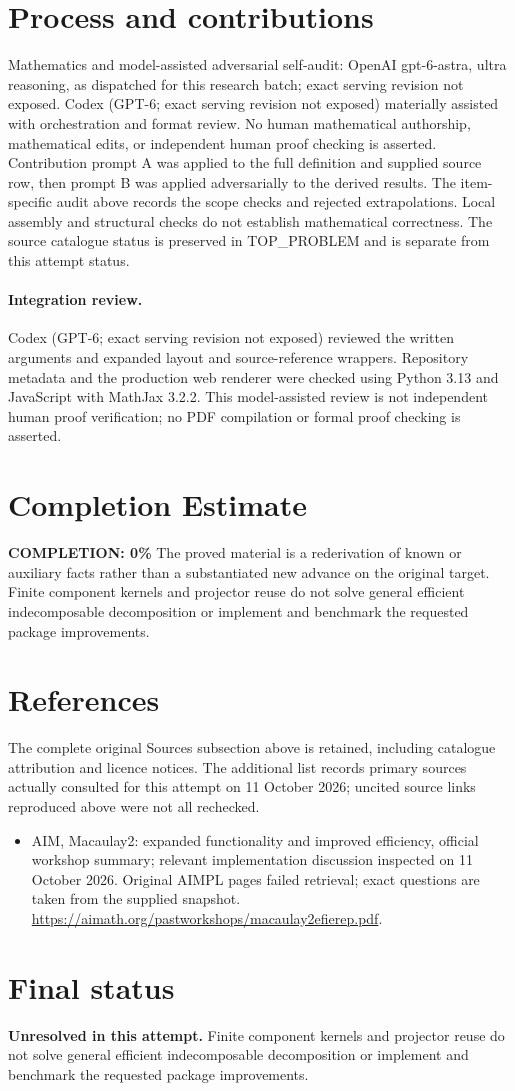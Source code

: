 \documentclass[11pt]{article}
\begin{document}
\section{Process and contributions}
Mathematics and model-assisted adversarial self-audit: OpenAI gpt-6-astra, ultra reasoning, as dispatched for this research batch; exact serving revision not exposed. Codex (GPT-6; exact serving revision not exposed) materially assisted with orchestration and format review. No human mathematical authorship, mathematical edits, or independent human proof checking is asserted.
Contribution prompt A was applied to the full definition and supplied source row, then prompt B was applied adversarially to the derived results. The item-specific audit above records the scope checks and rejected extrapolations. Local assembly and structural checks do not establish mathematical correctness. The source catalogue status is preserved in TOP\_PROBLEM and is separate from this attempt status.
\paragraph{Integration review.} Codex (GPT-6; exact serving revision not exposed) reviewed the written arguments and expanded layout and source-reference wrappers. Repository metadata and the production web renderer were checked using Python 3.13 and JavaScript with MathJax 3.2.2. This model-assisted review is not independent human proof verification; no PDF compilation or formal proof checking is asserted.

\section{Completion Estimate}
\noindent\textbf{COMPLETION: 0\%}
The proved material is a rederivation of known or auxiliary facts rather than a substantiated new advance on the original target. Finite component kernels and projector reuse do not solve general efficient indecomposable decomposition or implement and benchmark the requested package improvements.
\section{References}
The complete original Sources subsection above is retained, including catalogue attribution and licence notices. The additional list records primary sources actually consulted for this attempt on 11 October 2026; uncited source links reproduced above were not all rechecked.
\begin{itemize}
\item AIM, Macaulay2: expanded functionality and improved efficiency, official workshop summary; relevant implementation discussion inspected on 11 October 2026. Original AIMPL pages failed retrieval; exact questions are taken from the supplied snapshot. \url{https://aimath.org/pastworkshops/macaulay2efierep.pdf}.
\end{itemize}
\section{Final status}
\textbf{Unresolved in this attempt.} Finite component kernels and projector reuse do not solve general efficient indecomposable decomposition or implement and benchmark the requested package improvements.
\end{document}
